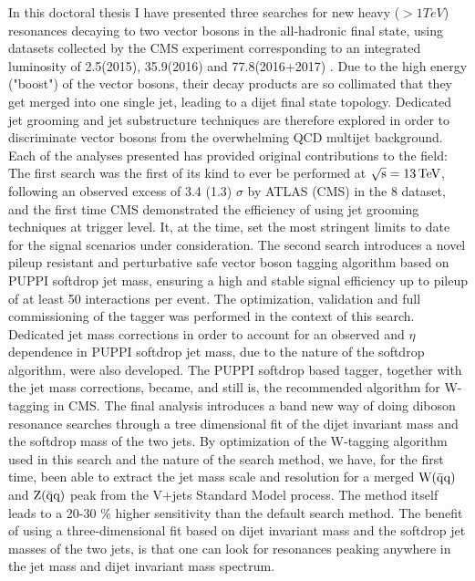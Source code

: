 \noindent In this doctoral thesis I have presented three searches for new heavy ($>1 TeV$) resonances decaying to two vector bosons in the all-hadronic final state, using datasets collected by the CMS experiment corresponding to an integrated luminosity of 2.5(2015), 35.9(2016) and 77.8(2016+2017) \fbinv. Due to the high energy ("boost") of the vector bosons, their decay products are so collimated that they get merged into one single jet, leading to a dijet final state topology.
Dedicated jet grooming and jet substructure techniques are therefore explored in order to discriminate vector bosons from the overwhelming QCD multijet background.\newline 
Each of the analyses presented has provided original contributions to the field: The first search was the first of its kind to ever be performed at $\sqrt{\rm{s}}=13 \,\text{Te\hspace{-.08em}V}$, following an observed excess of 3.4 (1.3) $\sigma$ by ATLAS (CMS) in the 8 \TeV dataset, and the first time CMS demonstrated the efficiency of using jet grooming techniques at trigger level. It, at the time, set the most stringent limits to date for the signal scenarios under consideration.\newline
The second search introduces a novel pileup resistant and perturbative safe vector boson tagging algorithm based on PUPPI softdrop jet mass, ensuring a high and stable signal efficiency up to pileup of at least 50 interactions per event. The optimization, validation and full commissioning of the tagger was performed in the context of this search. Dedicated jet mass corrections in order to account for an observed \PT and $\eta$ dependence in PUPPI softdrop jet mass, due to the nature of the softdrop algorithm, were also developed. The PUPPI softdrop based tagger, together with the jet mass corrections, became, and still is, the recommended algorithm for W-tagging in CMS. \newline
The final analysis introduces a band new way of doing diboson resonance searches through a tree dimensional fit of the dijet invariant mass and the softdrop mass of the two jets. By optimization of the W-tagging algorithm used in this search and the nature of the search method, we have, for the first time, been able to extract the jet mass scale and resolution for a merged  $\mathrm{W}(\bar{\rm{q}}\rm{q})$ and $\mathrm{Z}(\bar{\rm{q}}\rm{q})$ peak from the V+jets Standard Model process. The method itself leads to a 20-30 \% higher sensitivity than the default search method. 
\newline
\newline
The benefit of using a three-dimensional fit based on dijet invariant mass and the softdrop jet masses of the two jets, is that one can look for resonances peaking anywhere in the jet mass and dijet invariant mass spectrum.

